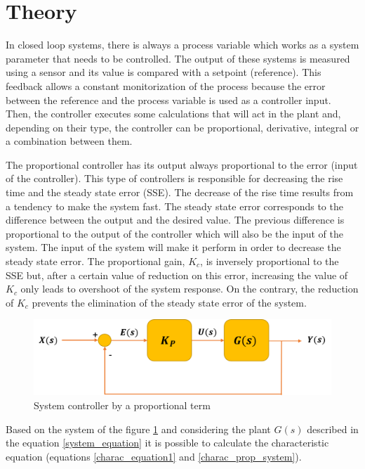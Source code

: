 \section{Theory}

In closed loop systems, there is always a process variable which works as a system parameter that needs to be controlled. The output of these systems is measured using a sensor and its value is compared with a setpoint (reference). This feedback allows a constant monitorization of the process because the error between the reference and the process variable is used as a controller input. Then, the controller executes some calculations that will act in the plant and, depending on their type, the controller can be proportional, derivative, integral or a combination between them.

The proportional controller has its output always proportional to the error (input of the controller). This type of controllers is responsible for decreasing the rise time and the steady state error (SSE). The decrease of the rise time results from a tendency to make the system fast. The steady state error corresponds to the difference between the output and the desired value. The previous difference is proportional to the output of the controller which will also be the input of the system. The input of the system will make it perform in order to decrease the steady state error. The proportional gain, $K_c$, is inversely proportional to the SSE but, after a certain value of reduction on this error, increasing the value of $K_c$ only leads to overshoot of the system response. On the contrary, the reduction of $K_c$ prevents the elimination of the steady state error of the system. 

\begin{figure}[H]
	\centering
	\includegraphics[scale=0.6]{figures/propor_controller.png}
	\caption{System controller by a proportional term}
	\label{propor_controller}
\end{figure}

Based on the system of the figure \ref{propor_controller} and considering the plant $G(s)$ described in the equation \ref{system_equation} it is possible to calculate the characteristic equation (equations \ref{charac_equation1} and \ref{charac_prop_system}).

